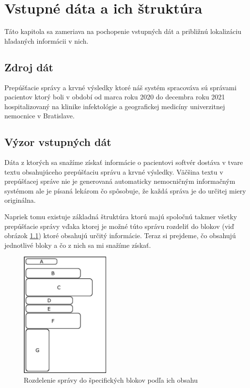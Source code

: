 \chapter{Vstupné dáta a ich štruktúra}

\label{kap:strukSpravy} %

Táto kapitola sa zameriava na pochopenie vstupných dát a približnú lokalizáciu hľadaných informácii v nich.

\section{Zdroj dát}

Prepúšťacie správy a krvné výsledky ktoré náš systém spracováva sú správami pacientov ktorý boli v období od marca roku 2020 do decembra roku 2021 hospitalizovaný na klinike infektológie a geografickej medicíny univerzitnej nemocnice v Bratislave.

\section{Výzor vstupných dát}

Dáta z ktorých sa snažíme získať informácie o pacientovi softvér dostáva v tvare textu obsahujúceho prepúšťaciu správu a krvné výsledky. Väčšina textu v prepúšťacej správe nie je generovaná automaticky nemocničným informačným systémom ale je písaná lekárom čo spôsobuje, že každá správa je do určitej miery originálna.

Napriek tomu existuje základná štruktúra ktorú majú spoločnú takmer všetky prepúšťacie správy vďaka ktorej je možné túto správu rozdeliť do blokov (viď obrázok \ref{obr:sprava}) ktoré obsahujú určitý informácie. Teraz si prejdeme, čo obsahujú jednotlivé bloky a čo z nich sa mi snažíme získať.

\begin{figure}
	\centerline{\includegraphics[width=0.4\textwidth]{images/vyzor_spravy}}
	\caption[Rozloženie správy]{Rozdelenie správy do špecifických blokov podľa ich obsahu}
	\label{obr:sprava}
\end{figure}

